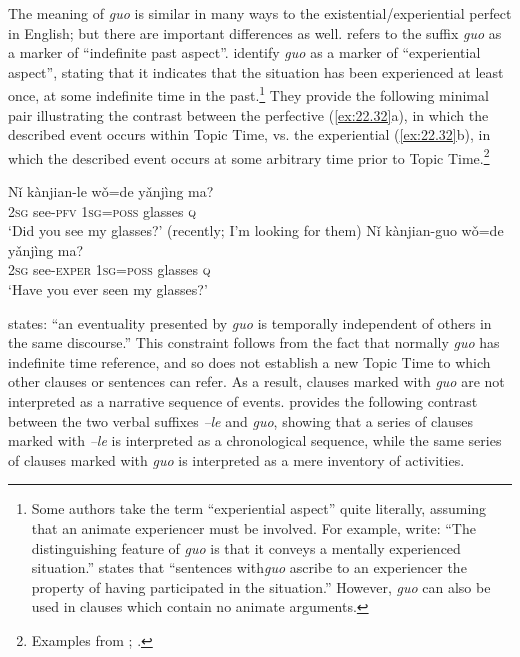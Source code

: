 The meaning of  \textit{guo} is similar in many ways to the existential/experiential perfect in English; but there are important differences as well. \citet{Chao1968} refers to the suffix \textit{guo} as a marker of “indefinite past aspect”. \citet[226]{LiThompson1981} identify \textit{guo} as a marker of “experiential aspect”, stating that it indicates that the situation has been experienced at least once, at some indefinite time in the past.\footnote{Some authors take the term “experiential aspect” quite literally, assuming that an animate experiencer must be involved. For example, \citet[144]{XiaoMcEnery2004} write: “The distinguishing feature of \textit{guo} is that it conveys a mentally experienced situation.” \citet[267]{Smith1997} states that “sentences with\textit{guo} ascribe to an experiencer the property of having participated in the situation.” However, \textit{guo} can also be used in clauses which contain no animate arguments.} They provide the following minimal pair illustrating the contrast between the perfective (\ref{ex:22.32}a), in which the described event occurs within Topic Time, vs. the experiential (\ref{ex:22.32}b), in which the described event occurs at some arbitrary time prior to Topic Time.\footnote{Examples from \citet[19]{Ma1977}; \citet[227]{LiThompson1981}.}


\ea \label{ex:22.32}
\ea  \gll Nǐ  kànjian-le  wǒ=de  yǎnjìng  ma?\\
\textsc{2sg}  see-\textsc{pfv}  \textsc{1sg}=\textsc{poss}  glasses  \textsc{q}\\
\glt ‘Did you see my glasses?’ (recently; I’m looking for them)
\ex \gll  Nǐ  kànjian-guo  wǒ=de  yǎnjìng  ma?\\
\textsc{2sg}  see-\textsc{exper}  \textsc{1sg}=\textsc{poss}  glasses  \textsc{q}\\
\glt ‘Have you ever seen my glasses?’
\z \z


\citet{Wu2009} states: “an eventuality presented by \textit{guo} is temporally independent of others in the same discourse.” This constraint follows from the fact that normally \textit{guo} has indefinite time reference, and so does not establish a new Topic Time to which other clauses or sentences can refer. As a result, clauses marked with \textit{guo} are not interpreted as a narrative sequence of events. \citet[308]{Iljic1990} provides the following contrast between the two verbal suffixes \textit{–le} and \textit{guo}, showing that a series of clauses marked with \textit{–le} is interpreted as a chronological sequence, while the same series of clauses marked with \textit{guo} is interpreted as a mere inventory of activities.



